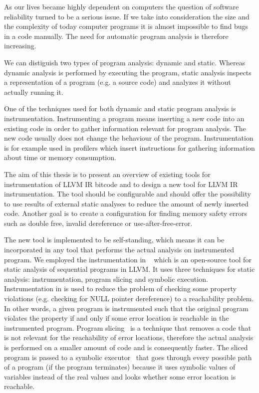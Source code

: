 As our lives became highly dependent on computers the question of software
reliability turned to be a serious issue. If we take into consideration the
size and the complexity of today computer programs it is almost impossible to
find bugs in a code manually. The need for automatic program analysis is
therefore increasing.

We can distiguish two types of program analysis: dynamic and static. Whereas
dynamic analysis is performed by executing the program, static analysis
inspects a representation of a program (e.g. a source code) and analyzes it
without actually running it.

One of the techniques used for both dynamic and static program analysis is
instrumentation. Instrumenting a program means inserting a new code into an
existing code in order to gather information relevant for program analysis. The
new code usually does not change the behaviour of the program. Instrumentation
is for example used in profilers which insert instructions for gathering
information about time or memory consumption. 

The aim of this thesis is to present an overview of existing tools for
instrumentation of LLVM IR bitcode and to design a new tool for LLVM IR
instrumentation. The tool should be configurable and should offer the
possibility to use results of external static analyses to reduce the amount of
newly inserted code. Another goal is to create a configuration for finding
memory safety errors such as double free, invalid dereference or
use-after-free-error.

The new tool is implemented to be self-standing, which means it can be
incorporated in any tool that performs the actual analysis on instrumented
program. We employed the instrumentation in \symbiotic~\cite{Symbiotic} which
is an open-source tool for static analysis of sequential programs in LLVM. It
uses three techniques for static analysis: instrumentation, program slicing and
symbolic execution. Instrumentation in \symbiotic is used to reduce the problem
of checking some property violations (e.g. checking for NULL pointer
dereference) to a reachability problem. In other words, a given program is
instrumented such that the original program violates the property if and only
if some error location is reachable in the instrumented program. Program
slicing~\cite{ChalupaThesis} is a technique that removes a code that is not
relevant for the reachability of error locations, therefore the actual
analysis is performed on a smaller amount of code and is consequently
faster. The sliced program is passed to a symbolic executor~\cite{King} that goes
through every possible path of a program (if the program terminates)
because it uses symbolic values of variables instead of the real values and
looks whether some error location is reachable.


